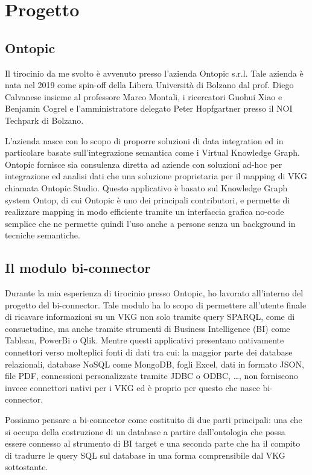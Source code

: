\chapter{Progetto}
\label{cha:experience}

\section{Ontopic}
\label{sec:ontopic}
Il tirocinio da me svolto è avvenuto presso l'azienda Ontopic s.r.l. Tale azienda è nata nel 2019 come spin-off della Libera Università di Bolzano dal prof. Diego Calvanese insieme al professore Marco Montali, i ricercatori Guohui Xiao e Benjamin Cogrel
e l’amministratore delegato Peter Hopfgartner presso il NOI Techpark di Bolzano\cite{Ontopic}.

L'azienda nasce con lo scopo di proporre soluzioni di data integration ed in particolare basate sull'integrazione semantica come i Virtual Knowledge Graph. Ontopic fornisce sia consulenza diretta ad aziende con soluzioni ad-hoc
per integrazione ed analisi dati che una soluzione proprietaria per il mapping di VKG chiamata Ontopic Studio. Questo applicativo è basato sul Knowledge Graph system Ontop, di cui Ontopic è uno dei principali contributori, e permette di realizzare mapping
in modo efficiente tramite un interfaccia grafica no-code semplice che ne permette quindi l'uso anche a persone senza un background in tecniche semantiche. \cite{OntopicStudio}

\section{Il modulo bi-connector}
\label{sec:bi-connector}
Durante la mia esperienza di tirocinio presso Ontopic, ho lavorato all'interno del progetto del bi-connector. Tale modulo ha lo scopo di permettere all'utente finale di ricavare informazioni su un VKG non solo tramite query SPARQL, come di consuetudine, ma anche
tramite strumenti di Business Intelligence (BI) come Tableau, PowerBi o Qlik.
Mentre questi applicativi presentano nativamente connettori verso molteplici fonti di dati tra cui: la maggior parte dei database relazionali, database NoSQL come MongoDB, fogli Excel,
dati in formato JSON, file PDF, connessioni personalizzate tramite JDBC o ODBC, \dots, non forniscono invece connettori nativi per i VKG ed è proprio per questo che nasce bi-connector.

\begin{comment}{}
In particolare, il primo applicativo di business intelligence su quale si è focalizzato lo sforzo di sviluppo è stato Tableau e perciò nel resto dell'elaborato farò principalmente riferimento a questo.
\end{comment}
Possiamo pensare a bi-connector come costituito di due parti principali: una che si occupa della costruzione di un database a partire dall'ontologia che possa essere connesso al strumento di BI target e una seconda parte che ha il compito di tradurre le query
SQL sul database in una forma comprensibile dal VKG sottostante.

